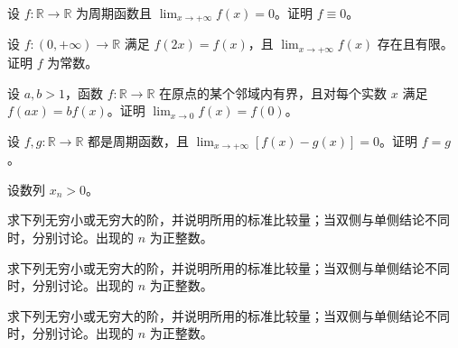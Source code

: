 \noindent\begin{minipage}{\textwidth}
设 $f:\mathbb R\to\mathbb R$ 为周期函数且 $\lim_{x\to+\infty}f(x)=0$。证明 $f\equiv0$。
\end{minipage}\par\vfill
\newpage
\noindent\begin{minipage}{\textwidth}
设 $f:(0,+\infty)\to\mathbb R$ 满足 $f(2x)=f(x)$，且 $\lim_{x\to+\infty}f(x)$ 存在且有限。证明 $f$ 为常数。
\end{minipage}\par\vfill
\noindent\begin{minipage}{\textwidth}
设 $a,b>1$，函数 $f:\mathbb R\to\mathbb R$ 在原点的某个邻域内有界，且对每个实数 $x$ 满足 $f(ax)=bf(x)$。证明 $\lim_{x\to0}f(x)=f(0)$。
\end{minipage}\par\vfill
\noindent\begin{minipage}{\textwidth}
设 $f,g:\mathbb R\to\mathbb R$ 都是周期函数，且 $\lim_{x\to+\infty}[f(x)-g(x)]=0$。证明 $f=g$。
\end{minipage}\par\vfill
\newpage
\noindent\begin{minipage}{\textwidth}
设数列 $x_n>0$。
\end{minipage}\par\vfill
\noindent\begin{minipage}{\textwidth}
求下列无穷小或无穷大的阶，并说明所用的标准比较量；当双侧与单侧结论不同时，分别讨论。出现的 $n$ 为正整数。
\end{minipage}\par\vfill
\noindent\begin{minipage}{\textwidth}
求下列无穷小或无穷大的阶，并说明所用的标准比较量；当双侧与单侧结论不同时，分别讨论。出现的 $n$ 为正整数。
\end{minipage}\par\vfill
\newpage
\noindent\begin{minipage}{\textwidth}
求下列无穷小或无穷大的阶，并说明所用的标准比较量；当双侧与单侧结论不同时，分别讨论。出现的 $n$ 为正整数。
\end{minipage}\par\vfill
